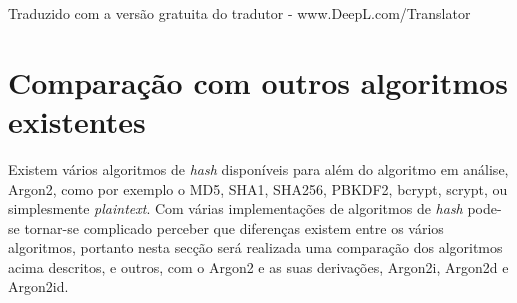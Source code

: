\documentclass[conference]{IEEEtran}
\begin{document}
Traduzido com a versão gratuita do tradutor - www.DeepL.com/Translator

\section{Comparação com outros algoritmos existentes}

Existem vários algoritmos de \textit{hash} disponíveis para além do algoritmo em análise, Argon2, como por 
exemplo o MD5, SHA1, SHA256, PBKDF2, bcrypt, scrypt, ou simplesmente \textit{plaintext}. Com várias 
implementações de algoritmos de \textit{hash} pode-se tornar-se complicado perceber que 
diferenças existem entre os vários algoritmos, portanto nesta secção 
será realizada uma comparação dos algoritmos acima descritos, e outros, 
com o Argon2 e as suas derivações, Argon2i, Argon2d e Argon2id. 
\end{document}
